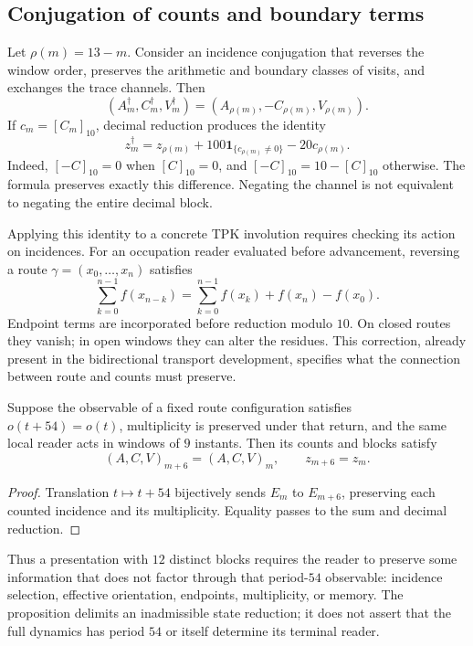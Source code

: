 \subsection{Conjugation of counts and boundary terms}
\label{subsec:registro-conjugacion-incidencial}

Let \(\rho(m)=13-m\). Consider an incidence conjugation
that reverses the window order, preserves the arithmetic and
boundary classes of visits, and exchanges the trace channels.
Then
\[
 (A_m^\dagger,C_m^\dagger,V_m^\dagger)
 =(A_{\rho(m)},-C_{\rho(m)},V_{\rho(m)}).
\]
If \(c_m=[C_m]_{10}\), decimal reduction produces the identity
\begin{equation}
 z_m^\dagger=z_{\rho(m)}
       +100\mathbf1_{\{c_{\rho(m)}\ne0\}}-20c_{\rho(m)}.
 \label{eq:registro-conjugacion-decimal}
\end{equation}
Indeed, \([-C]_{10}=0\) when \([C]_{10}=0\), and
\([-C]_{10}=10-[C]_{10}\) otherwise. The formula preserves
exactly this difference. Negating the channel is not equivalent to negating
the entire decimal block.

Applying this identity to a concrete TPK involution requires
checking its action on incidences. For an occupation reader
evaluated before advancement, reversing a route
\(\gamma=(x_0,\ldots,x_n)\) satisfies
\[
 \sum_{k=0}^{n-1}f(x_{n-k})
 =\sum_{k=0}^{n-1}f(x_k)+f(x_n)-f(x_0).
\]
Endpoint terms are incorporated before reduction modulo
\(10\). On closed routes they vanish; in open windows they can
alter the residues. This correction, already present in the bidirectional
transport development, specifies what the connection
between route and counts must preserve.

\begin{proposition}
Suppose the observable of a fixed route configuration satisfies
\(o(t+54)=o(t)\), multiplicity is preserved under that return,
and the same local reader acts in windows of \(9\) instants.
Then its counts and blocks satisfy
\[
 (A,C,V)_{m+6}=(A,C,V)_m,\qquad z_{m+6}=z_m.
\]
\end{proposition}

\begin{proof}
Translation \(t\mapsto t+54\) bijectively sends \(E_m\)
to \(E_{m+6}\), preserving each counted incidence and its multiplicity.
Equality passes to the sum and decimal reduction.
\end{proof}

Thus a presentation with \(12\) distinct blocks requires
the reader to preserve some information that does not factor through that
period-\(54\) observable: incidence selection, effective orientation,
endpoints, multiplicity, or memory. The proposition delimits an
inadmissible state reduction; it does not assert that the full dynamics has
period \(54\) or itself determine its terminal reader.
